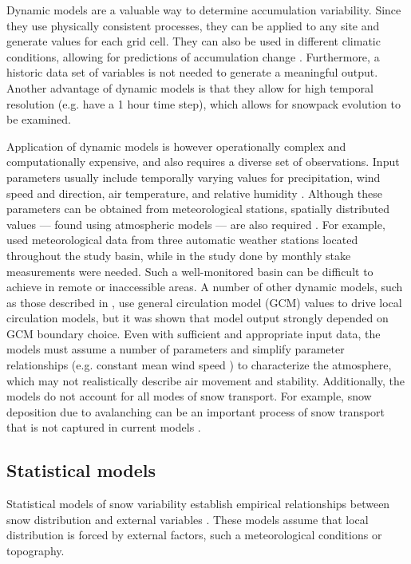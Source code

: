 \documentclass{sfuthesis}
\begin{document}
Dynamic models are a valuable way to determine accumulation variability. Since they use physically consistent processes, they can be applied to any site and generate values for each grid cell. They can also be used in different climatic conditions, allowing for predictions of accumulation change \citep{Clark2011}. Furthermore, a historic data set of variables is not needed to generate a meaningful output. Another advantage of dynamic models is that they allow for high temporal resolution (e.g. \cite{Mott2008} have a 1 hour time step), which allows for snowpack evolution to be examined.

Application of dynamic models is however operationally complex and computationally expensive, and also requires a diverse set of observations. Input parameters usually include temporally varying values for precipitation, wind speed and direction, air temperature, and relative humidity \citep{Liston2006}. Although these parameters can be obtained from meteorological stations, spatially distributed values --- found using atmospheric models --- are also required \citep{Liston2006, Mott2008}. For example, \cite{Dadic2010} used meteorological data from three automatic weather stations located throughout the study basin, while in the study done by \cite{Mott2008} monthly stake measurements were needed. Such a well-monitored basin can be difficult to achieve in remote or inaccessible areas. A number of other dynamic models, such as those described in \cite{Fowler2007}, use general circulation model (GCM) values to drive local circulation models, but it was shown that model output strongly depended on GCM boundary choice.  Even with sufficient and appropriate input data, the models must assume a number of parameters and simplify parameter relationships (e.g. constant mean wind speed \citep{Mott2008}) to characterize the atmosphere, which may not realistically describe air movement and stability. Additionally, the models do not account for all modes of snow transport. For example, snow deposition due to avalanching can be an important process of snow transport that is not captured in current models \citep{Mott2008}. 

\subsection{Statistical models}
Statistical models of snow variability establish empirical relationships between snow distribution and external variables \citep{Fowler2007}. These models assume that local distribution is forced by external factors, such a meteorological conditions or topography.
\end{document}
